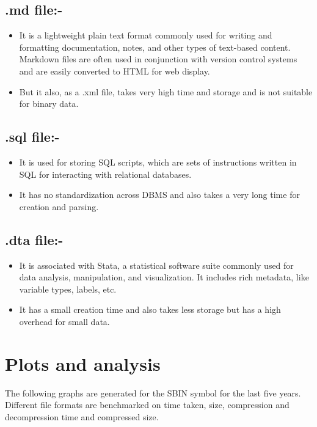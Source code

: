 \documentclass[11pt]{article}
\begin{document}
\subsection{.md file:-}
\begin{itemize}
    \item It is a lightweight plain text format commonly used for writing and formatting documentation, notes, and other types of text-based content. Markdown files are often used in conjunction with version control systems and are easily converted to HTML for web display.
    \item But it also, as a .xml file, takes very high time and storage and is not suitable for binary data.
\end{itemize}

\subsection{.sql file:-}
\begin{itemize}
    \item It is used for storing SQL scripts, which are sets of instructions written in SQL for interacting with relational databases.
    \item It has no standardization across DBMS and also takes a very long time for creation and parsing.
\end{itemize}

\subsection{.dta file:-}
\begin{itemize}
    \item It is associated with Stata, a statistical software suite commonly used for data analysis, manipulation, and visualization. It includes rich metadata, like variable types, labels, etc.
    \item It has a small creation time and also takes less storage but has a high overhead for small data.
\end{itemize}

\section{Plots and analysis}

The following graphs are generated for the SBIN symbol for the last five years. Different file formats are benchmarked on time taken, size, compression and decompression time and compressed size.
\end{document}
